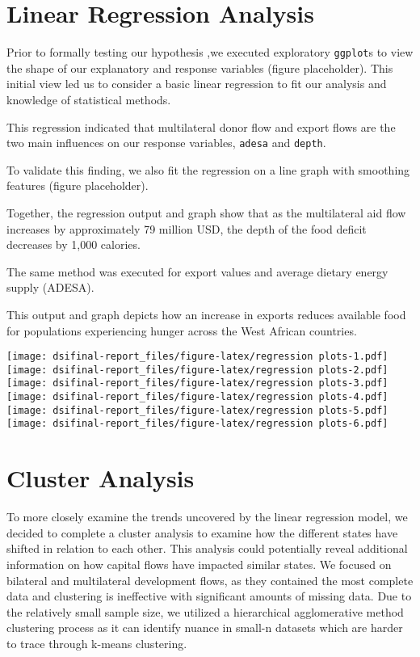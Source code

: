 \documentclass[
]{article}
\begin{document}
\hypertarget{linear-regression-analysis}{%
\section{Linear Regression Analysis}\label{linear-regression-analysis}}

Prior to formally testing our hypothesis ,we executed exploratory
\texttt{ggplot}s to view the shape of our explanatory and response
variables (figure placeholder). This initial view led us to consider a
basic linear regression to fit our analysis and knowledge of statistical
methods.

This regression indicated that multilateral donor flow and export flows
are the two main influences on our response variables, \texttt{adesa}
and \texttt{depth}.

To validate this finding, we also fit the regression on a line graph
with smoothing features (figure placeholder).

Together, the regression output and graph show that as the multilateral
aid flow increases by approximately 79 million USD, the depth of the
food deficit decreases by 1,000 calories.

The same method was executed for export values and average dietary
energy supply (ADESA).

This output and graph depicts how an increase in exports reduces
available food for populations experiencing hunger across the West
African countries.

\texttt{[image: dsifinal-report\_files/figure-latex/regression plots-1.pdf]}
\texttt{[image: dsifinal-report\_files/figure-latex/regression plots-2.pdf]}
\texttt{[image: dsifinal-report\_files/figure-latex/regression plots-3.pdf]}
\texttt{[image: dsifinal-report\_files/figure-latex/regression plots-4.pdf]}
\texttt{[image: dsifinal-report\_files/figure-latex/regression plots-5.pdf]}
\texttt{[image: dsifinal-report\_files/figure-latex/regression plots-6.pdf]}

\hypertarget{cluster-analysis}{%
\section{Cluster Analysis}\label{cluster-analysis}}

To more closely examine the trends uncovered by the linear regression
model, we decided to complete a cluster analysis to examine how the
different states have shifted in relation to each other. This analysis
could potentially reveal additional information on how capital flows
have impacted similar states. We focused on bilateral and multilateral
development flows, as they contained the most complete data and
clustering is ineffective with significant amounts of missing data. Due
to the relatively small sample size, we utilized a hierarchical
agglomerative method clustering process as it can identify nuance in
small-n datasets which are harder to trace through k-means clustering.
\end{document}
